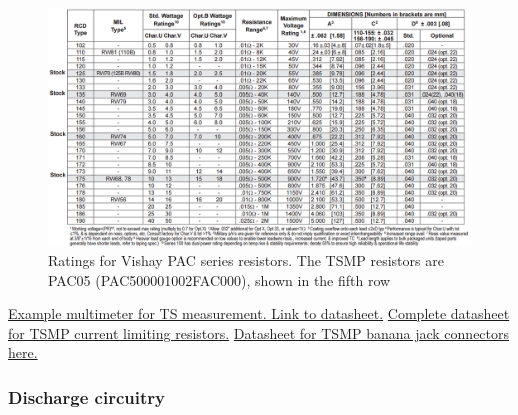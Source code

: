\documentclass{article}
\begin{document}
\begin{figure}[H]
	\centering
	\includegraphics[width=\linewidth]{TSMP_resistor_ratings}
	\caption{Ratings for Vishay PAC series resistors. The TSMP resistors are PAC05 (PAC500001002FAC000), shown in the fifth row}
\end{figure}
\href{https://www.gossenmetrawatt.com/resources/tt/hit27/db_gb.pdf}{Example multimeter for TS measurement. Link to datasheet.}
\href{http://www.vishay.com/docs/28731/pacserie.pdf}{Complete datasheet for TSMP current limiting resistors.}
\href{http://www.mouser.com/ds/2/159/D72930_02_10_06-21562.pdf}{Datasheet for TSMP banana jack connectors here.}

\setcounter{subsubsection}{9}
\subsubsection{Discharge circuitry}\label{appendix_discharge}
\end{document}
